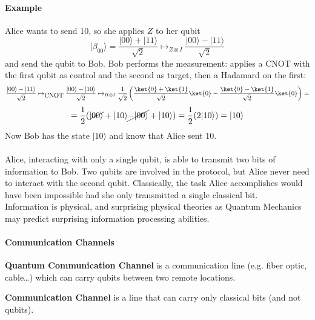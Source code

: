 \documentclass[10pt]{report}
\begin{document}
\paragraph{Example} Alice wants to send $10$, so she applies $Z$ to her qubit
$$|\beta_{00}\rangle = \frac{|00\rangle+|11\rangle}{\sqrt{2}} \mapsto_{Z\otimes I}\frac{|00\rangle-|11\rangle}{\sqrt{2}}$$
and send the qubit to Bob. Bob performs the measurement: applies a CNOT with the first qubit as control and the second as target, then a Hadamard on the first:
$$\frac{|00\rangle-|11\rangle}{\sqrt{2}} \mapsto_{\hbox{CNOT}}\frac{|00\rangle-|10\rangle}{\sqrt{2}}\mapsto_{H\otimes I}\frac{1}{\sqrt{2}}\left(\frac{\ket{0}+\ket{1}}{\sqrt{2}}\ket{0}-\frac{\ket{0}-\ket{1}}{\sqrt{2}}\ket{0}\right)=$$
$$=\frac{1}{2}(\cancel{|00\rangle}+|10\rangle \cancel{-|00\rangle}+|10\rangle) = \frac{1}{2}(2|10\rangle) = |10\rangle$$
Now Bob has the state $|10\rangle$ and know that Alice sent $10$.\\\\
Alice, interacting with only a single qubit, is able to transmit two bits of information to Bob. Two qubits are involved in the protocol, but Alice never need to interact with the second qubit. Classically, the task Alice accomplishes would have been impossible had she only transmitted a single classical bit.\\
Information is physical, and surprising physical theories as Quantum Mechanics may predict surprising information processing abilities.
\paragraph{Communication Channels}
\begin{list}{}{}
	\item \textbf{Quantum Communication Channel} is a communication line (e.g. fiber optic, cable\ldots) which can carry qubits between two remote locations.
	\item \textbf{Communication Channel} is a line that can carry only classical bits (and not qubits).
\end{list}
\end{document}
